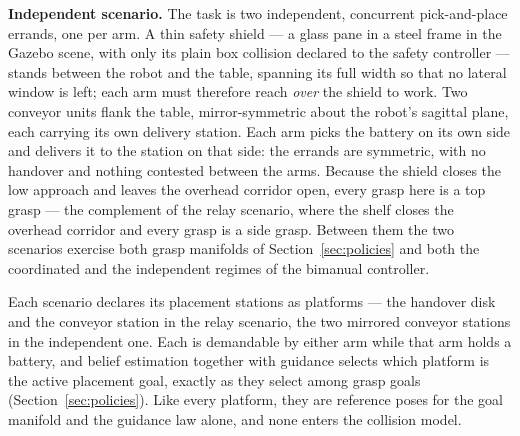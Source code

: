 \documentclass[12pt,a4paper,twoside,openright]{report}
\begin{document}
\textbf{Independent scenario.} The task is two independent, concurrent pick-and-place errands, one per arm. A thin safety shield --- a glass pane in a steel frame in the Gazebo scene, with only its plain box collision declared to the safety controller --- stands between the robot and the table, spanning its full width so that no lateral window is left; each arm must therefore reach \emph{over} the shield to work. Two conveyor units flank the table, mirror-symmetric about the robot's sagittal plane, each carrying its own delivery station. Each arm picks the battery on its own side and delivers it to the station on that side: the errands are symmetric, with no handover and nothing contested between the arms. Because the shield closes the low approach and leaves the overhead corridor open, every grasp here is a top grasp --- the complement of the relay scenario, where the shelf closes the overhead corridor and every grasp is a side grasp. Between them the two scenarios exercise both grasp manifolds of Section~\ref{sec:policies} and both the coordinated and the independent regimes of the bimanual controller.

Each scenario declares its placement stations as platforms --- the handover disk and the conveyor station in the relay scenario, the two mirrored conveyor stations in the independent one. Each is demandable by either arm while that arm holds a battery, and belief estimation together with guidance selects which platform is the active placement goal, exactly as they select among grasp goals (Section~\ref{sec:policies}). Like every platform, they are reference poses for the goal manifold and the guidance law alone, and none enters the collision model.
\end{document}
